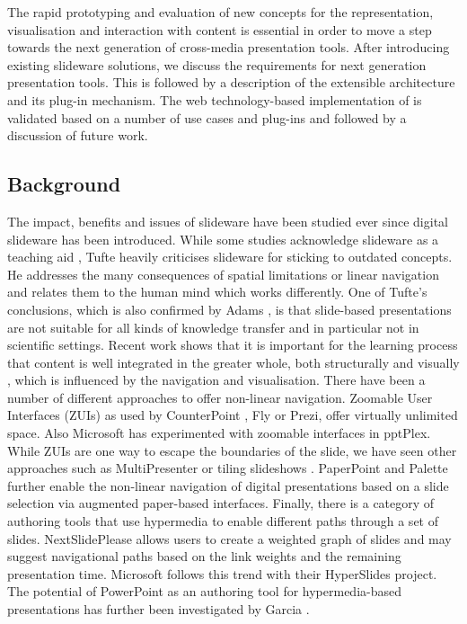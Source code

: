 \documentclass[a4paper,12pt]{report}
\begin{document}
    The rapid prototyping and evaluation of new concepts for the
    representation, visualisation and interaction with content is essential in
    order to move a step towards the next generation of cross-media
    presentation tools. After introducing existing slideware solutions, we
    discuss the requirements for next generation presentation tools. This is
    followed by a description of the extensible \mxp architecture and its
    plug-in mechanism. The web technology-based implementation of \mxp is
    validated based on a number of use cases and \mxp plug-ins and followed by
    a discussion of future work.

   \subsection{Background}

    The impact, benefits and issues of slideware have been studied ever since
    digital slideware has been introduced. While some studies acknowledge
    slideware as a teaching aid \citep{holzinger-1}, Tufte \citep{tufte-1}
    heavily criticises slideware for sticking to outdated concepts. He
    addresses the many consequences of spatial limitations or linear navigation
    and relates them to the human mind which works differently. One of Tufte's
    conclusions, which is also confirmed by Adams \citep{adams-1}, is that
    slide-based presentations are not suitable for all kinds of knowledge
    transfer and in particular not in scientific settings. Recent work shows
    that it is important for the learning process that content is well
    integrated in the greater whole, both structurally and visually
    \citep{gross-1}, which is influenced by the navigation and visualisation.
    There have been a number of different approaches to offer non-linear
    navigation. Zoomable User Interfaces (ZUIs) as used by CounterPoint
    \citep{good-1}, Fly \citep{lichtschlag-1} or Prezi, offer virtually
    unlimited space. Also Microsoft has experimented with zoomable interfaces
    in pptPlex. While ZUIs are one way to escape the boundaries of the slide,
    we have seen other approaches such as MultiPresenter \citep{lanir-1} or
    tiling slideshows \citep{chen-1}. PaperPoint \citep{signer-1} and Palette
    \citep{nelson-2} further enable the non-linear navigation of digital
    presentations based on a slide selection via augmented paper-based
    interfaces. Finally, there is a category of authoring tools that use
    hypermedia to enable different paths through a set of slides.
    NextSlidePlease \citep{spicer-1} allows users to create a weighted graph of
    slides and may suggest navigational paths based on the link weights and the
    remaining presentation time. Microsoft follows this trend with their
    HyperSlides \citep{edge-1} project. The potential of PowerPoint as an
    authoring tool for hypermedia-based presentations has further been
    investigated by Garcia \citep{garcia-1}.
\end{document}
